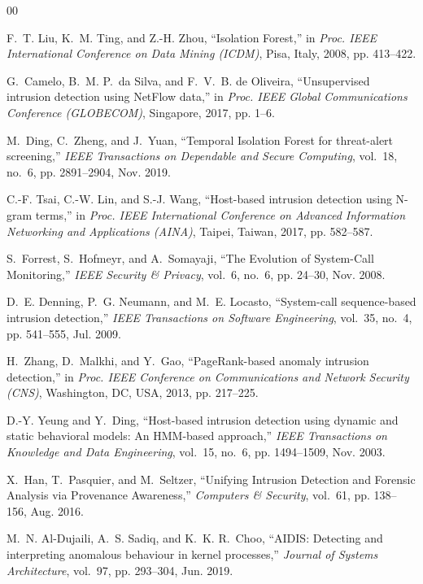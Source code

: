 \documentclass[conference]{IEEEtran}
\begin{document}
\balance
\begin{thebibliography}{00}

F.~T. Liu, K.~M. Ting, and Z.-H. Zhou, ``Isolation Forest,'' in \emph{Proc. IEEE International Conference on Data Mining (ICDM)}, Pisa, Italy, 2008, pp. 413--422.

G.~Camelo, B.~M. P.~da Silva, and F.~V.~B. de Oliveira, ``Unsupervised intrusion detection using NetFlow data,'' in \emph{Proc. IEEE Global Communications Conference (GLOBECOM)}, Singapore, 2017, pp. 1--6.

M.~Ding, C.~Zheng, and J.~Yuan, ``Temporal Isolation Forest for threat-alert screening,'' \emph{IEEE Transactions on Dependable and Secure Computing}, vol.~18, no.~6, pp. 2891--2904, Nov. 2019.

C.-F. Tsai, C.-W. Lin, and S.-J. Wang, ``Host-based intrusion detection using N-gram terms,'' in \emph{Proc. IEEE International Conference on Advanced Information Networking and Applications (AINA)}, Taipei, Taiwan, 2017, pp. 582--587.

S.~Forrest, S.~Hofmeyr, and A.~Somayaji, ``The Evolution of System-Call Monitoring,'' \emph{IEEE Security \& Privacy}, vol.~6, no.~6, pp. 24--30, Nov. 2008.

D.~E. Denning, P.~G. Neumann, and M.~E. Locasto, ``System-call sequence-based intrusion detection,'' \emph{IEEE Transactions on Software Engineering}, vol.~35, no.~4, pp. 541--555, Jul. 2009.

H.~Zhang, D.~Malkhi, and Y.~Gao, ``PageRank-based anomaly intrusion detection,'' in \emph{Proc. IEEE Conference on Communications and Network Security (CNS)}, Washington, DC, USA, 2013, pp. 217--225.

D.-Y. Yeung and Y.~Ding, ``Host-based intrusion detection using dynamic and static behavioral models: An HMM-based approach,'' \emph{IEEE Transactions on Knowledge and Data Engineering}, vol.~15, no.~6, pp. 1494--1509, Nov. 2003.

X.~Han, T.~Pasquier, and M.~Seltzer, ``Unifying Intrusion Detection and Forensic Analysis via Provenance Awareness,'' \emph{Computers \& Security}, vol.~61, pp. 138--156, Aug. 2016.

M.~N. Al-Dujaili, A.~S. Sadiq, and K.~K. R.~Choo, ``AIDIS: Detecting and interpreting anomalous behaviour in kernel processes,'' \emph{Journal of Systems Architecture}, vol.~97, pp. 293--304, Jun. 2019.


\end{thebibliography}
\end{document}
